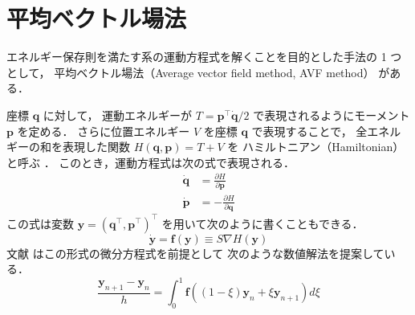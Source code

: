 %

\chapter{平均ベクトル場法}

エネルギー保存則を満たす系の運動方程式を解くことを目的とした手法の 1 つとして，
平均ベクトル場法（Average vector field method, AVF method） \cite{Quispel2008} がある．

座標 $\bm{q}$ に対して，
運動エネルギーが $T = \bm{p}^\top \dot{\bm{q}} / 2$ で表現されるようにモーメント $\bm{p}$ を定める．
さらに位置エネルギー $V$ を座標 $\bm{q}$ で表現することで，
全エネルギーの和を表現した関数 $H(\bm{q}, \bm{p}) = T + V$ を
ハミルトニアン（Hamiltonian）と呼ぶ
\cite[Section 3.2]{Morse1953}．
このとき，運動方程式は次の式で表現される．
\begin{align}
    \dot{\bm{q}} & = \frac{\partial H}{\partial \bm{p}}  \\
    \dot{\bm{p}} & = -\frac{\partial H}{\partial \bm{q}}
\end{align}
この式は変数 $\bm{y} = (\bm{q}^\top, \bm{p}^\top)^\top$ を用いて次のように書くこともできる．
\begin{equation}
    \dot{\bm{y}} = \bm{f}(\bm{y}) \equiv S \nabla H(\bm{y})
\end{equation}
文献 \cite{Quispel2008} はこの形式の微分方程式を前提として
次のような数値解法を提案している．
\begin{equation}
    \frac{\bm{y}_{n+1} - \bm{y}_n}{h}
    = \int_{0}^{1} \bm{f}((1 - \xi) \bm{y}_n + \xi \bm{y}_{n+1}) d \xi
    \label{eq:ode_average-vector-field_update-2-order}
\end{equation}

